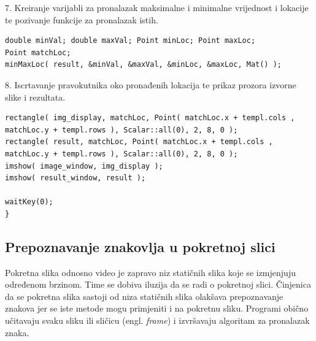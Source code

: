 7. Kreiranje varijabli za pronalazak maksimalne i minimalne vrijednost i
lokacije te pozivanje funkcije za pronalazak istih.
\begin{lstlisting}[caption={}]
double minVal; double maxVal; Point minLoc; Point maxLoc;
Point matchLoc;
minMaxLoc( result, &minVal, &maxVal, &minLoc, &maxLoc, Mat() );
\end{lstlisting}

8. Iscrtavanje pravokutnika oko pronađenih lokacija te prikaz prozora
izvorne slike i rezultata.
\begin{lstlisting}[caption={}]
rectangle( img_display, matchLoc, Point( matchLoc.x + templ.cols , matchLoc.y + templ.rows ), Scalar::all(0), 2, 8, 0 );
rectangle( result, matchLoc, Point( matchLoc.x + templ.cols , matchLoc.y + templ.rows ), Scalar::all(0), 2, 8, 0 );
imshow( image_window, img_display );
imshow( result_window, result );

waitKey(0);
}
\end{lstlisting}

\subsection{Prepoznavanje znakovlja u pokretnoj slici} %

Pokretna slika odnosno video je zapravo niz statičnih slika 
koje se izmjenjuju određenom brzinom. Time se dobiva iluzija da se 
radi o pokretnoj slici. Činjenica da se pokretna slika sastoji od
niza statičnih slika olakšava prepoznavanje 
znakova jer se iste metode mogu primjeniti i na pokretnu sliku. 
Programi obično učitavaju svaku sliku ili sličicu (engl. \textit{frame}) i izvršavaju algoritam za pronalazak znaka.

